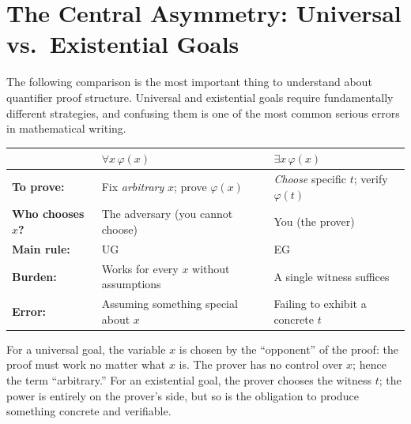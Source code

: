 
\section*{The Central Asymmetry: Universal vs.\ Existential Goals}

\begin{exposition}
The following comparison is the most important thing to understand about
quantifier proof structure. Universal and existential goals require fundamentally
different strategies, and confusing them is one of the most common serious errors
in mathematical writing.
\end{exposition}

\begin{tcolorbox}[colback=gray!6, colframe=gray!40, arc=2pt,
  left=6pt, right=6pt, top=4pt, bottom=4pt,
  title={\small\textbf{Universal vs.\ Existential Goals: The Fundamental Difference}},
  fonttitle=\small\bfseries]
\small
\begin{tabular}{l l l}
\toprule
 & \textbf{$\forall x\,\varphi(x)$} & \textbf{$\exists x\,\varphi(x)$} \\
\midrule
\textbf{To prove:} & Fix \emph{arbitrary} $x$; prove $\varphi(x)$ & \emph{Choose} specific $t$; verify $\varphi(t)$ \\
\textbf{Who chooses $x$?} & The adversary (you cannot choose) & You (the prover) \\
\textbf{Main rule:} & UG & EG \\
\textbf{Burden:} & Works for every $x$ without assumptions & A single witness suffices \\
\textbf{Error:} & Assuming something special about $x$ & Failing to exhibit a concrete $t$ \\
\bottomrule
\end{tabular}
\end{tcolorbox}

\begin{remark*}
For a universal goal, the variable $x$ is chosen by the ``opponent'' of the
proof: the proof must work no matter what $x$ is. The prover has no control
over $x$; hence the term ``arbitrary.'' For an existential goal, the prover
chooses the witness $t$; the power is entirely on the prover's side, but so is
the obligation to produce something concrete and verifiable.
\end{remark*}

